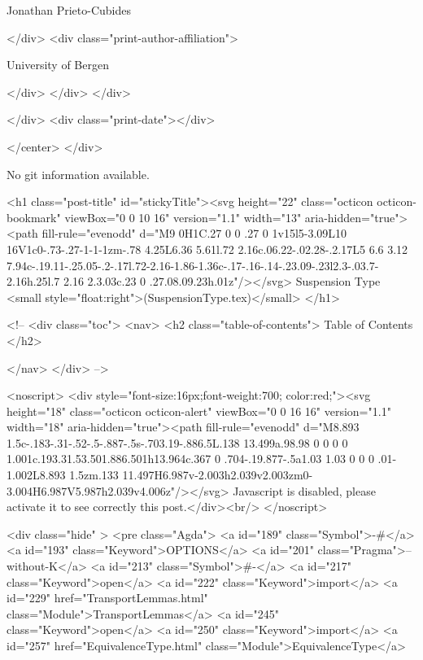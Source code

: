                   Jonathan Prieto-Cubides
                
              </div>
              <div class="print-author-affiliation">
                
                  University of Bergen
                
                </div>
            </div>
          </div>
          
          
        </div>
        <div class="print-date"></div>
        
        
    </center>
  </div>

  
  No git information available.
  

  <h1 class="post-title" id="stickyTitle"><svg height="22" class="octicon octicon-bookmark" viewBox="0 0 10 16" version="1.1" width="13" aria-hidden="true"><path fill-rule="evenodd" d="M9 0H1C.27 0 0 .27 0 1v15l5-3.09L10 16V1c0-.73-.27-1-1-1zm-.78 4.25L6.36 5.61l.72 2.16c.06.22-.02.28-.2.17L5 6.6 3.12 7.94c-.19.11-.25.05-.2-.17l.72-2.16-1.86-1.36c-.17-.16-.14-.23.09-.23l2.3-.03.7-2.16h.25l.7 2.16 2.3.03c.23 0 .27.08.09.23h.01z"/></svg> Suspension Type <small style="float:right">(SuspensionType.tex)</small>
  </h1>

  <!-- 
  <div class="toc">
    <nav>
    <h2 class="table-of-contents"> Table of Contents </h2>
      

    </nav>
  </div>
   -->

  <noscript>
  <div style="font-size:16px;font-weight:700; color:red;"><svg height="18" class="octicon octicon-alert" viewBox="0 0 16 16" version="1.1" width="18" aria-hidden="true"><path fill-rule="evenodd" d="M8.893 1.5c-.183-.31-.52-.5-.887-.5s-.703.19-.886.5L.138 13.499a.98.98 0 0 0 0 1.001c.193.31.53.501.886.501h13.964c.367 0 .704-.19.877-.5a1.03 1.03 0 0 0 .01-1.002L8.893 1.5zm.133 11.497H6.987v-2.003h2.039v2.003zm0-3.004H6.987V5.987h2.039v4.006z"/></svg> Javascript is disabled, please activate it to see correctly this post.</div><br/>
  </noscript>

  <div class="hide" >
<pre class="Agda">
<a id="189" class="Symbol">{-#</a> <a id="193" class="Keyword">OPTIONS</a> <a id="201" class="Pragma">--without-K</a> <a id="213" class="Symbol">#-}</a>
<a id="217" class="Keyword">open</a> <a id="222" class="Keyword">import</a> <a id="229" href="TransportLemmas.html" class="Module">TransportLemmas</a>
<a id="245" class="Keyword">open</a> <a id="250" class="Keyword">import</a> <a id="257" href="EquivalenceType.html" class="Module">EquivalenceType</a>

